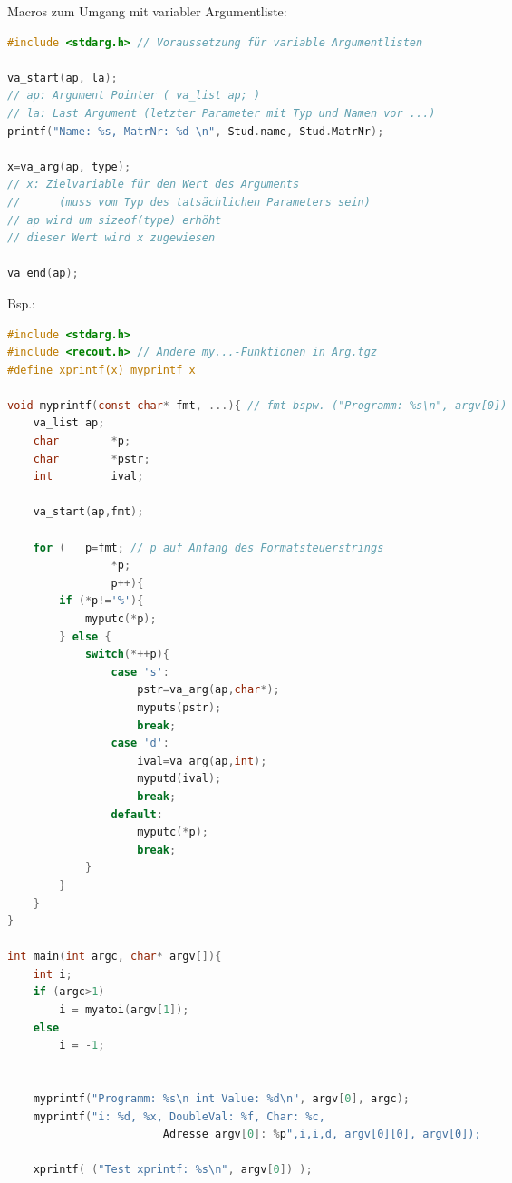 \begin{multicols}{3}
Macros zum Umgang mit variabler Argumentliste:
\begin{lstlisting}[language=C]
#include <stdarg.h>	// Voraussetzung für variable Argumentlisten

va_start(ap, la);	
// ap: Argument Pointer ( va_list ap; )
// la: Last Argument (letzter Parameter mit Typ und Namen vor ...)
printf("Name: %s, MatrNr: %d \n", Stud.name, Stud.MatrNr); 

x=va_arg(ap, type);
// x: Zielvariable für den Wert des Arguments 
//		(muss vom Typ des tatsächlichen Parameters sein)
// ap wird um sizeof(type) erhöht
// dieser Wert wird x zugewiesen

va_end(ap);
\end{lstlisting}
Bsp.:
\begin{lstlisting}[language=C]
#include <stdarg.h>
#include <recout.h>	// Andere my...-Funktionen in Arg.tgz
#define xprintf(x) myprintf x

void myprintf(const char* fmt, ...){ // fmt bspw. ("Programm: %s\n", argv[0])
	va_list ap;
	char		*p;
	char		*pstr;
	int			ival;
	
	va_start(ap,fmt);
	
	for (	p=fmt; // p auf Anfang des Formatsteuerstrings
				*p;
				p++){
		if (*p!='%'){
			myputc(*p);
		} else {
			switch(*++p){
				case 's':
					pstr=va_arg(ap,char*);
					myputs(pstr);
					break;
				case 'd':
					ival=va_arg(ap,int);
					myputd(ival);
					break;
				default:
					myputc(*p);
					break;
			}
		}
	}
}

int main(int argc, char* argv[]){
	int i;
	if (argc>1)
		i = myatoi(argv[1]);
	else
		i = -1;
		
	
	myprintf("Programm: %s\n int Value: %d\n", argv[0], argc);
	myprintf("i: %d, %x, DoubleVal: %f, Char: %c, 
						Adresse argv[0]: %p",i,i,d, argv[0][0], argv[0]);
						
	xprintf( ("Test xprintf: %s\n", argv[0]) );
\end{lstlisting}
\end{multicols}


